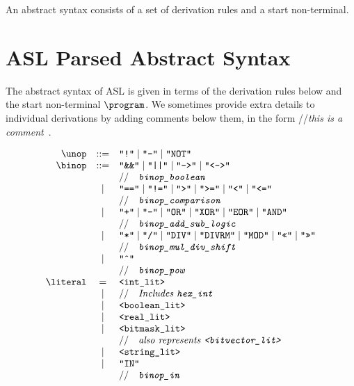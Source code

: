 \documentclass{book}
\begin{document}
\newpage

An abstract syntax consists of a set of derivation rules and a start non-terminal.

\newcommand\ASTComment[1]{//\quad\textit{#1}\ }

\section{ASL Parsed Abstract Syntax}

The abstract syntax of ASL is given in terms of the derivation rules below and the start non-terminal $\program$.
%
We sometimes provide extra details to individual derivations by adding comments below them, in the form \ASTComment{this is a comment}.

\[
\begin{array}{rcl}
\unop &::=& \texttt{"!"} \;|\; \texttt{"-"} \;|\; \texttt{"NOT"} \\
\binop &::=& \texttt{"\&\&"} \;|\; \texttt{"||"} \;|\; \texttt{"-->"} \;|\;  \texttt{"<->"}  \\
 & & \ASTComment{\texttt{binop\_boolean}}\\

 &|& \texttt{"=="} \;|\; \texttt{"!="}  \;|\; \texttt{">"}  \;|\; \texttt{">="} \;|\; \texttt{"<"} \;|\; \texttt{"<="}   \\
 & & \ASTComment{\texttt{binop\_comparison}}\\

 &|& \texttt{"+"} \;|\; \texttt{"-"}  \;|\; \texttt{"OR"}  \;|\; \texttt{"XOR"} \;|\; \texttt{"EOR"} \;|\; \texttt{"AND"}   \\
 & & \ASTComment{\texttt{binop\_add\_sub\_logic}}\\

 &|& \texttt{"*"} \;|\; \texttt{"/"}  \;|\; \texttt{"DIV"}  \;|\; \texttt{"DIVRM"} \;|\; \texttt{"MOD"}  \;|\; \texttt{"<<"}  \;|\; \texttt{">>"}    \\
 & & \ASTComment{\texttt{binop\_mul\_div\_shift}}\\

 &|& \texttt{"\^{}"}   \\
 & & \ASTComment{\texttt{binop\_pow}}\\

\literal &=& \texttt{<int\_lit>}  \\
 &|&\ASTComment{Includes \texttt{hex\_int}} \\
 &|&\texttt{<boolean\_lit>}  \\
 &|& \texttt{<real\_lit>}  \\
 &|& \texttt{<bitmask\_lit>}   \\
 & & \ASTComment{also represents \texttt{<bitvector\_lit>}}\\
 &|&\texttt{<string\_lit>} \\
 &|& \texttt{"IN"}   \\
 & & \ASTComment{\texttt{binop\_in}}\\


\end{array}\]
\end{document}
